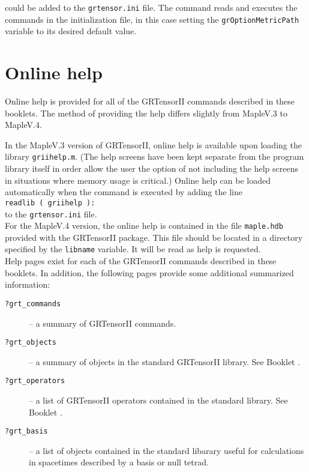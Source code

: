 \documentclass{article}
\begin{document}
\noindent could be added to the \texttt{grtensor.ini} file. The
 command reads and executes the commands in the
initialization file, in this case setting the \texttt{grOptionMetricPath}
variable to its desired default value.
%
\section{Online help} \label{sec:help}
%
Online help is provided for all of the GRTensorII commands described in
these booklets. The method of providing the help differs slightly from
MapleV.3 to MapleV.4.

In the MapleV.3 version of GRTensorII, online help is available upon
loading the library \texttt{griihelp.m}. (The help screens have been
kept separate from the program library itself in order allow the user
the option of not including the help screens in situations where
memory usage is critical.) Online help can be loaded automatically
when the  command is executed by adding the line\\

\noindent\texttt{readlib ( griihelp ):}\\

\noindent to the \texttt{grtensor.ini} file.\\

For the MapleV.4 version, the online help is contained in the file
\texttt{maple.hdb} provided with the GRTensorII package. This file
should be located in a directory specified by the \texttt{libname}
variable. It will be read as help is requested.\\

Help pages exist for each of the GRTensorII commands described in
these booklets. In addition, the following pages provide some additional
summarized information:
\begin{description}
  \item[\texttt{?grt\_commands}] -- a summary of GRTensorII commands.
  \item[\texttt{?grt\_objects}] -- a summary of objects in the standard
    GRTensorII library. See Booklet \grCalcRef.  
  \item[\texttt{?grt\_operators}] -- a list of GRTensorII operators
    contained in the standard library. See Booklet \grCalcRef.
  \item[\texttt{?grt\_basis}] -- a list of objects contained in the
    standard libarary useful for calculations in spacetimes described
    by a basis or null tetrad.
\end{description}
\end{document}
